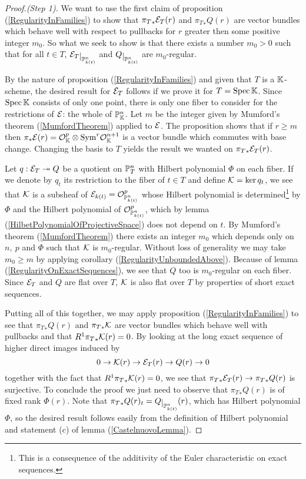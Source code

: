 \begin{proof}[Proof.(Step 1)]
We want to use the first claim of proposition (\ref{RegularityInFamilies}) to show that ${\pi_T}_\ast\mathcal{E}_T(r)$ and ${\pi_T}_\ast Q(r)$ are vector bundles which behave well with respect to pullbacks for $r$ greater then some positive integer $m_0$. So what we seek to show is that there exists a number $m_0>0$ such that for all $t\in T$, $\Ec_T\res{\Pj^n_{k(t)}}$ and $Q\res{\Pj^n_{k(t)}}$ are $m_0$-regular. 

By the nature of proposition (\ref{RegularityInFamilies}) and given that $T$ is a $\mathbb{K}$-scheme, the desired result for $\mathcal{E}_T$ follows if we prove it for $T=\mathrm{Spec}\,\mathbb{K}$.
Since $\mathrm{Spec}\, \mathbb{K}$ consists of only one point, there is only one fiber to consider for the restrictions of $\mathcal{E}$: the whole of $\mathbb{P}^n_{\mathbb{K}}$. Let $m$ be the integer given by Mumford's theorem (\ref{MumfordTheorem}) applied to $\mathcal{E}$. The proposition shows that if $r\geq m$ then $\pi_\ast\mathcal{E}(r)=\mathcal{O}_{\mathbb{K}}^p\otimes\mathrm{Sym}^r\mathcal{O}_{\mathbb{K}}^{n+1}$ is a vector bundle which commutes with base change. Changing the basis to $T$ yields the result we wanted on ${\pi_T}_\ast\mathcal{E}_T(r)$.

Let $q:\mathcal{E}_T\twoheadrightarrow Q$ be a quotient on $\mathbb{P}^n_T$ with Hilbert polynomial $\Phi$ on each fiber. If we denote by $q_t$ its restriction to the fiber of $t\in T$ and define $\mathcal{K}=\ker q_t$, we see that $\mathcal{K}$ is a subsheaf of $\mathcal{E}_{k(t)}=\mathcal{O}_{\mathbb{P}^n_{k(t)}}^p$ whose Hilbert polynomial is determined\footnote{This is a consequence of the additivity of the Euler characteristic on exact sequences.} by $\Phi$ and the Hilbert polynomial of $\mathcal{O}_{\mathbb{P}^n_{k(t)}}^p$, which by lemma (\ref{HilbetPolynomialOfProjectiveSpace}) does not depend on $t$. By Mumford's theorem (\ref{MumfordTheorem}) there exists an integer $m_0$ which depends only on $n,\ p$ and $\Phi$ such that $\mathcal{K}$ is $m_0$-regular. Without loss of generality we may take $m_0\geq m$ by applying corollary (\ref{RegularityUnboundedAbove}). Because of lemma (\ref{RegularityOnExactSequences}), we see that $Q$ too is $m_0$-regular on each fiber. Since $\mathcal{E}_T$ and $Q$ are flat over $T$, $\mathcal{K}$ is also flat over $T$ by properties of short exact sequences. 

Putting all of this together, we may apply proposition (\ref{RegularityInFamilies}) to see that ${\pi_T}_\ast Q(r)$ and ${\pi_T}_\ast\mathcal{K}$ are vector bundles which behave well with pullbacks and that $R^1{\pi_T}_\ast \mathcal{K}(r)=0$. 
By looking at the long exact sequence of higher direct images induced by
\[0\to\mathcal{K}(r)\to\mathcal{E}_T(r)\to Q(r)\to 0\]
together with the fact that $R^1{\pi_T}_\ast \mathcal{K}(r)=0$, we see that ${\pi_T}_\ast\mathcal{E}_T(r)\to{\pi_T}_\ast Q(r)$ is surjective. To conclude the proof we just need to observe that ${\pi_T}_\ast Q(r)$ is of fixed rank $\Phi(r)$. Note that ${\pi_T}_\ast Q(r)_t=Q\res{\Pj^n_{k(t)}}(r)$, which has Hilbert polynomial $\Phi$, so the desired result follows easily from the definition of Hilbert polynomial and statement (c) of lemma (\ref{CastelnuovoLemma}).
\end{proof}

